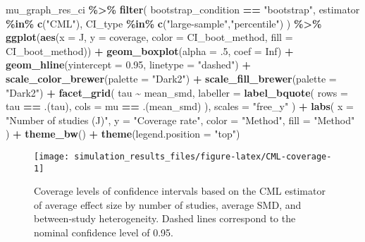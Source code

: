 \documentclass[
]{article}
\newenvironment{Shaded}{\begin{snugshade}}{\end{snugshade}}
\newcommand{\AttributeTok}[1]{\textcolor[rgb]{0.13,0.29,0.53}{#1}}
\newcommand{\ConstantTok}[1]{\textcolor[rgb]{0.56,0.35,0.01}{#1}}
\newcommand{\DecValTok}[1]{\textcolor[rgb]{0.00,0.00,0.81}{#1}}
\newcommand{\FloatTok}[1]{\textcolor[rgb]{0.00,0.00,0.81}{#1}}
\newcommand{\FunctionTok}[1]{\textcolor[rgb]{0.13,0.29,0.53}{\textbf{#1}}}
\newcommand{\NormalTok}[1]{#1}
\newcommand{\SpecialCharTok}[1]{\textcolor[rgb]{0.81,0.36,0.00}{\textbf{#1}}}
\newcommand{\StringTok}[1]{\textcolor[rgb]{0.31,0.60,0.02}{#1}}
\begin{document}
\begin{Shaded}
\begin{Highlighting}[]
\NormalTok{mu\_graph\_res\_ci }\SpecialCharTok{\%\textgreater{}\%}
  \FunctionTok{filter}\NormalTok{(}
\NormalTok{    bootstrap\_condition }\SpecialCharTok{==} \StringTok{"bootstrap"}\NormalTok{,}
\NormalTok{    estimator }\SpecialCharTok{\%in\%} \FunctionTok{c}\NormalTok{(}\StringTok{"CML"}\NormalTok{),}
\NormalTok{    CI\_type }\SpecialCharTok{\%in\%} \FunctionTok{c}\NormalTok{(}\StringTok{"large{-}sample"}\NormalTok{,}\StringTok{"percentile"}\NormalTok{)}
\NormalTok{  ) }\SpecialCharTok{\%\textgreater{}\%}
  \FunctionTok{ggplot}\NormalTok{(}\FunctionTok{aes}\NormalTok{(}\AttributeTok{x =}\NormalTok{ J, }\AttributeTok{y =}\NormalTok{ coverage, }\AttributeTok{color =}\NormalTok{ CI\_boot\_method, }\AttributeTok{fill =}\NormalTok{ CI\_boot\_method)) }\SpecialCharTok{+}
  \FunctionTok{geom\_boxplot}\NormalTok{(}\AttributeTok{alpha =}\NormalTok{ .}\DecValTok{5}\NormalTok{, }\AttributeTok{coef =} \ConstantTok{Inf}\NormalTok{) }\SpecialCharTok{+}
  \FunctionTok{geom\_hline}\NormalTok{(}\AttributeTok{yintercept =} \FloatTok{0.95}\NormalTok{, }\AttributeTok{linetype =} \StringTok{"dashed"}\NormalTok{) }\SpecialCharTok{+}
  \FunctionTok{scale\_color\_brewer}\NormalTok{(}\AttributeTok{palette =} \StringTok{"Dark2"}\NormalTok{) }\SpecialCharTok{+}
  \FunctionTok{scale\_fill\_brewer}\NormalTok{(}\AttributeTok{palette =} \StringTok{"Dark2"}\NormalTok{) }\SpecialCharTok{+}
  \FunctionTok{facet\_grid}\NormalTok{(}
\NormalTok{    tau }\SpecialCharTok{\textasciitilde{}}\NormalTok{ mean\_smd, }
    \AttributeTok{labeller =} \FunctionTok{label\_bquote}\NormalTok{(}
      \AttributeTok{rows =}\NormalTok{ tau }\SpecialCharTok{==}\NormalTok{ .(tau),}
      \AttributeTok{cols =}\NormalTok{ mu }\SpecialCharTok{==}\NormalTok{ .(mean\_smd)}
\NormalTok{    ),}
    \AttributeTok{scales =} \StringTok{"free\_y"}
\NormalTok{  ) }\SpecialCharTok{+}
  \FunctionTok{labs}\NormalTok{(}
    \AttributeTok{x =} \StringTok{"Number of studies (J)"}\NormalTok{, }
    \AttributeTok{y =} \StringTok{"Coverage rate"}\NormalTok{, }
    \AttributeTok{color =} \StringTok{"Method"}\NormalTok{,}
    \AttributeTok{fill =} \StringTok{"Method"}
\NormalTok{  ) }\SpecialCharTok{+} 
  \FunctionTok{theme\_bw}\NormalTok{() }\SpecialCharTok{+}
  \FunctionTok{theme}\NormalTok{(}\AttributeTok{legend.position =} \StringTok{"top"}\NormalTok{)}
\end{Highlighting}
\end{Shaded}

\begin{sidewaysfigure}
\texttt{[image: simulation\_results\_files/figure-latex/CML-coverage-1]} \caption{Coverage levels of confidence intervals based on the CML estimator of average effect size by number of studies, average SMD, and between-study heterogeneity. Dashed lines correspond to the nominal confidence level of 0.95.}\label{fig:CML-coverage}
\end{sidewaysfigure}
\end{document}
